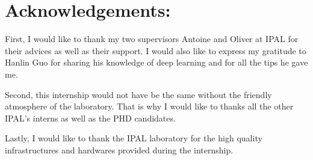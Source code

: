 \documentclass[a4paper,11pt]{report}
\begin{document}
\chapter{Acknowledgements:}

	First, I would like to thank my two supervisors Antoine and Oliver at IPAL for their advices as well as their support. I would also like to express my gratitude to Hanlin Guo for sharing his knowledge of deep learning and for all the tips he gave me.\\\par
	
	Second, this internship would not have be the same without the friendly atmosphere of the laboratory. That is why I would like to thanks all the other IPAL's interns as well as the PHD candidates.\\\par 
	
	Lastly, I would like to thank the IPAL laboratory for the high quality infrastructures and hardwares provided during the internship.
	
\end{document}
